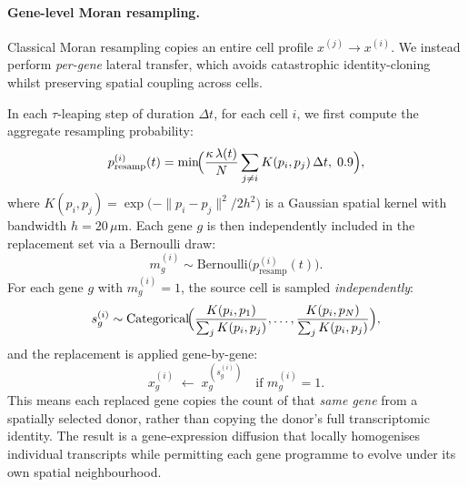 \documentclass[11pt]{article}
\begin{document}
\paragraph{Gene-level Moran resampling.}
Classical Moran resampling copies an entire cell profile $x^{(j)} \to x^{(i)}$. We instead perform \emph{per-gene} lateral transfer, which avoids catastrophic identity-cloning whilst preserving spatial coupling across cells.

In each $\tau$-leaping step of duration $\Delta t$, for each cell $i$, we first compute the aggregate resampling probability:
\begin{equation}
  p_{\text{resamp}}^{(i)}(t) = \min\!\Bigl(\frac{\kappa\,\lambda(t)}{N}\sum_{j \neq i} K(p_i, p_j)\,\Delta t,\; 0.9\Bigr),
  \label{eq:presamp}
\end{equation}
where $K(p_i, p_j) = \exp\!\bigl(-\|p_i - p_j\|^2 / 2h^2\bigr)$ is a Gaussian spatial kernel with bandwidth $h = 20\,\mu$m. Each gene $g$ is then independently included in the replacement set via a Bernoulli draw:
\[
  m_g^{(i)} \sim \text{Bernoulli}\bigl(p_{\text{resamp}}^{(i)}(t)\bigr).
\]
For each gene $g$ with $m_g^{(i)} = 1$, the source cell is sampled \emph{independently}:
\[
  s_g^{(i)} \sim \text{Categorical}\!\Bigl(\frac{K(p_i, p_1)}{\sum_{j} K(p_i,p_j)}, \ldots, \frac{K(p_i, p_N)}{\sum_{j} K(p_i,p_j)}\Bigr),
\]
and the replacement is applied gene-by-gene:
\begin{equation}
  x_g^{(i)} \;\leftarrow\; x_g^{(s_g^{(i)})}\quad \text{if } m_g^{(i)} = 1.
  \label{eq:geneswap}
\end{equation}
This means each replaced gene copies the count of that \emph{same gene} from a spatially selected donor, rather than copying the donor's full transcriptomic identity. The result is a gene-expression diffusion that locally homogenises individual transcripts while permitting each gene programme to evolve under its own spatial neighbourhood.
\end{document}
